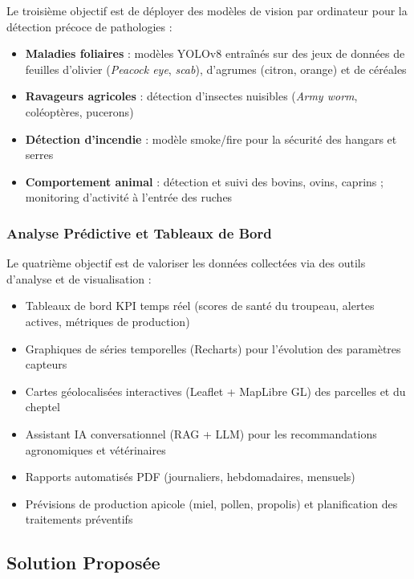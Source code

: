 \documentclass[12pt, a4paper]{report}
\begin{document}
Le troisième objectif est de déployer des modèles de vision par ordinateur pour la détection précoce de pathologies :

\begin{itemize}[leftmargin=*, label=\textcolor{primary}{$\bullet$}]
    \item \textbf{Maladies foliaires} : modèles YOLOv8 entraînés sur des jeux de données de feuilles d'olivier (\textit{Peacock eye}, \textit{scab}), d'agrumes (citron, orange) et de céréales
    \item \textbf{Ravageurs agricoles} : détection d'insectes nuisibles (\textit{Army worm}, coléoptères, pucerons)
    \item \textbf{Détection d'incendie} : modèle smoke/fire pour la sécurité des hangars et serres
    \item \textbf{Comportement animal} : détection et suivi des bovins, ovins, caprins ; monitoring d'activité à l'entrée des ruches
\end{itemize}

\subsubsection{Analyse Prédictive et Tableaux de Bord}

Le quatrième objectif est de valoriser les données collectées via des outils d'analyse et de visualisation :

\begin{itemize}[leftmargin=*, label=\textcolor{primary}{$\bullet$}]
    \item Tableaux de bord KPI temps réel (scores de santé du troupeau, alertes actives, métriques de production)
    \item Graphiques de séries temporelles (Recharts) pour l'évolution des paramètres capteurs
    \item Cartes géolocalisées interactives (Leaflet + MapLibre GL) des parcelles et du cheptel
    \item Assistant IA conversationnel (RAG + LLM) pour les recommandations agronomiques et vétérinaires
    \item Rapports automatisés PDF (journaliers, hebdomadaires, mensuels)
    \item Prévisions de production apicole (miel, pollen, propolis) et planification des traitements préventifs

\end{itemize}

\subsection{Solution Proposée}
\end{document}
